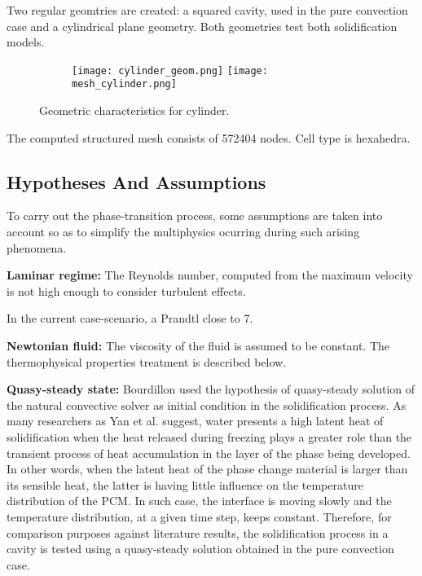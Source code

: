 \setlength{\parindent}{0.5cm} Two regular geomtries are created: a squared cavity, used in the pure convection case and a cylindrical plane geometry. Both geometries test both solidification models.

\begin{figure}[h!]
	\centering
	\begin{subfigure}{\linewidth}
		\texttt{[image: cylinder\_geom.png]}\hfill
		\texttt{[image: mesh\_cylinder.png]}	
		\label{BBPF_NCMF}
	\end{subfigure}
	\label{3.7fig}
	\caption{Geometric characteristics for cylinder.}
\end{figure} 
The computed structured mesh consists of 572404 nodes. Cell type is hexahedra. 

\subsection{Hypotheses And Assumptions}

\setlength{\parindent}{0.5cm} To carry out the phase-transition process, some assumptions are taken into account so as to simplify the multiphysics ocurring during such arising phenomena. 

\textbf{Laminar regime:} The Reynolds number, computed from the maximum velocity is not high enough to consider turbulent effects. 

\noindent In the current case-scenario, a Prandtl close to 7. 

\textbf{Newtonian fluid:} The viscosity of the fluid is assumed to be constant.
The thermophysical properties treatment is described below.

\textbf{Quasy-steady state:} Bourdillon \cite{bourdillon_2016} used the hypothesis of quasy-steady solution of the natural convective solver as initial condition in the solidification process. As many researchers as Yan et al. \cite{yan_xu_qiu_gang_2017} suggest, water presents a high latent heat of solidification when the heat released during freezing plays a greater role than the transient process of heat accumulation in the layer of the phase being developed. In other words, when the latent heat of the phase change material is larger than its sensible heat, the latter is having little influence on the temperature distribution of the PCM. In such case, the interface is moving slowly and the temperature distribution, at a given time step, keeps constant. Therefore, for comparison purposes against literature results, the solidification process in a cavity is tested using a quasy-steady solution obtained in the pure convection case.

